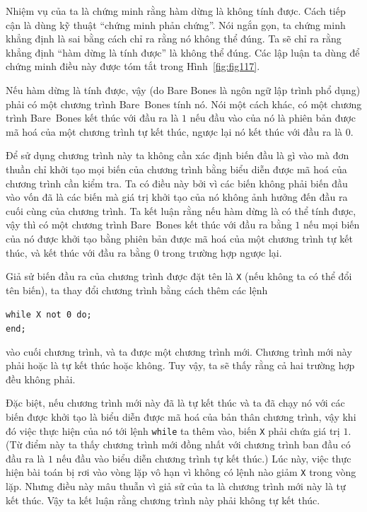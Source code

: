 Nhiệm vụ của ta là chứng minh rằng hàm dừng là không tính được. Cách tiếp cận là dùng kỹ
thuật ``chứng minh phản chứng''. Nói ngắn gọn, ta chứng minh khẳng định là sai bằng cách
chỉ ra rằng nó không thể đúng. Ta sẽ chỉ ra rằng khẳng định ``hàm dừng là tính được'' là
không thể đúng. Các lập luận ta dùng để chứng minh điều này được tóm tắt trong
Hình~\ref{fig:fig117}.


Nếu hàm dừng là tính được, vậy (do Bare Bones là ngôn ngữ lập trình phổ dụng) phải có một
chương trình Bare~Bones tính nó. Nói một cách khác, có một chương trình Bare~Bones kết
thúc với đầu ra là $1$ nếu đầu vào của nó là phiên bản được mã hoá của một chương trình tự
kết thúc, ngược lại nó kết thúc với đầu ra là $0$.

Để sử dụng chương trình này ta không cần xác định biến đầu là gì vào mà đơn thuần chỉ khởi
tạo mọi biến của chương trình bằng biểu diễn được mã hoá của chương trình cần kiểm tra. Ta
có điều này bởi vì các biến không phải biến đầu vào vốn đã là các biến mà giá trị khởi tạo
của nó không ảnh hưởng đến đầu ra cuối cùng của chương trình. Ta kết luận rằng nếu hàm
dừng là có thể tính được, vậy thì có một chương trình Bare~Bones kết thúc với đầu ra bằng
$1$ nếu mọi biến của nó được khởi tạo bằng phiên bản được mã hoá của một chương trình tự
kết thúc, và kết thúc với đầu ra bằng $0$ trong trường hợp ngược lại.

Giả sử biến đầu ra của chương trình được đặt tên là \texttt{X} (nếu không ta có thể đổi
tên biến), ta thay đổi chương trình bằng cách thêm các lệnh
\begin{flushleft}
  \qquad \qquad\qquad \texttt{while X not 0 do;} \\
  \qquad\qquad\qquad\texttt{end;}
\end{flushleft}
vào cuối chương trình, và ta được một chương trình mới. Chương trình mới này phải hoặc là
tự kết thúc hoặc không. Tuy vậy, ta sẽ thấy rằng cả hai trường hợp đều không phải.

Đặc biệt, nếu chương trình mới này đã là tự kết thúc và ta đã chạy nó với các biến được
khởi tạo là biểu diễn được mã hoá của bản thân chương trình, vậy khi đó việc thực hiện của
nó tới lệnh \texttt{while} ta thêm vào, biến \texttt{X} phải chứa giá trị $1$. (Từ điểm
này ta thấy chương trình mới đồng nhất với chương trình ban đầu có đầu ra là $1$ nếu đầu
vào biểu diễn chương trình tự kết thúc.) Lúc này, việc thực hiện bài toán bị rơi vào vòng
lặp vô hạn vì không có lệnh nào giảm \texttt{X} trong vòng lặp. Nhưng điều này mâu thuẫn
vì giả sử của ta là chương trình mới này là tự kết thúc. Vậy ta kết luận rằng chương trình
này phải không tự kết thúc.

